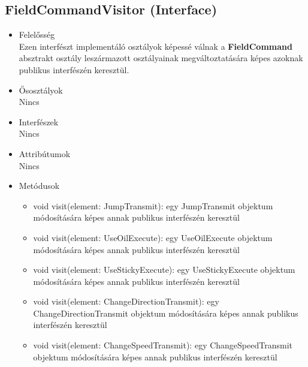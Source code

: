 \subsection{FieldCommandVisitor (Interface)}
\begin{itemize}

\item Felelősség\\
    Ezen interfészt implementáló osztályok képessé válnak a \textbf{FieldCommand} absztrakt osztály leszármazott osztályainak megváltoztatására képes azoknak publikus interfészén keresztül.

\item Ősosztályok\\
Nincs

\item Interfészek\\
Nincs

\item Attribútumok\\
Nincs

\item Metódusok\\

\begin{itemize}
    \item void visit(element: JumpTransmit): egy JumpTransmit objektum módosítására képes annak publikus interfészén keresztül
    \item void visit(element: UseOilExecute): egy UseOilExecute objektum módosítására képes annak publikus interfészén keresztül
    \item void visit(element: UseStickyExecute): egy UseStickyExecute objektum módosítására képes annak publikus interfészén keresztül
    \item void visit(element: ChangeDirectionTransmit): egy ChangeDirectionTransmit objektum módosítására képes annak publikus interfészén keresztül
    \item void visit(element: ChangeSpeedTransmit): egy ChangeSpeedTransmit objektum módosítására képes annak publikus interfészén keresztül
\end{itemize}

\end{itemize}


